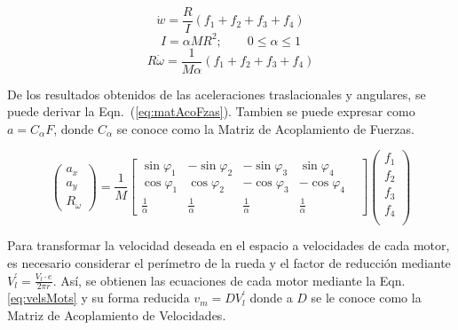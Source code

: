 \documentclass[twocolumn,10pt]{amrob}
\begin{document}
\begin{equation}
  \dot{w} =\frac{R}{I}\left(f_1+f_2+f_3+f_4\right) \label{eq:omega4Mots}
\end{equation}
\begin{equation}
  I = \alpha M R^{2} ;\qquad 0\leq \alpha \leq1 \label{eq:inercia}
\end{equation}
\begin{equation}
  R\dot{\omega} = \frac{1}{M\alpha}\left(f_1+f_2+f_3+f_4\right) \label{eq:Romega}
\end{equation}

De los resultados obtenidos de las aceleraciones traslacionales y angulares, se puede derivar la Eqn.~(\ref{eq:matAcoFzas}). Tambien se puede expresar como \(a=C_\alpha F \), donde \( C_\alpha \) se conoce como la Matriz de Acoplamiento de Fuerzas. \par

\begin{equation}
  \left(\begin{array}{c}
    a_x \\ a_y \\R_{\dot{\omega}}
  \end{array}\right)= \frac{1}{M}
  \begin{bmatrix}
    \sin\varphi_1 & -\sin\varphi_2 & -\sin\varphi_3 & \sin\varphi_4 \\
    \cos\varphi_1 & \cos\varphi_2 & -\cos\varphi_3 & -\cos\varphi_4 & \\
    \frac{1}{\alpha} & \frac{1}{\alpha}  & \frac{1}{\alpha}  &\frac{1}{\alpha} 
  \end{bmatrix}
  \left(\begin{array}{c}
    f_1 \\ f_2 \\ f_3 \\ f_4  \label{eq:matAcoFzas}\\ 
  \end{array}\right) 
\end{equation}

Para transformar la velocidad deseada en el espacio a velocidades de cada motor, es necesario considerar el perímetro de la rueda y el factor de reducción mediante \(V_{l}^{'} = \frac{ V_l \cdot e } { 2 \pi r} \). Así, se obtienen las ecuaciones de cada motor mediante la Eqn. \eqref{eq:velsMots}  y su forma reducida \(v_m = D V_{l}^{'}\) donde a \( D \) se le conoce como la Matriz de Acoplamiento de Velocidades. \par 
\end{document}
